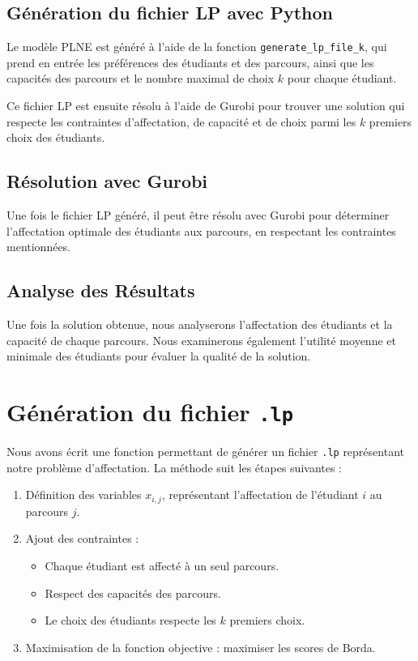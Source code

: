 \documentclass[a4paper,11pt]{article}
\begin{document}
\subsection{Génération du fichier LP avec Python}
Le modèle PLNE est généré à l’aide de la fonction \texttt{generate\_lp\_file\_k}, qui prend en entrée les préférences des étudiants et des parcours, ainsi que les capacités des parcours et le nombre maximal de choix \( k \) pour chaque étudiant.


Ce fichier LP est ensuite résolu à l'aide de Gurobi pour trouver une solution qui respecte les contraintes d'affectation, de capacité et de choix parmi les \( k \) premiers choix des étudiants.

\subsection{Résolution avec Gurobi}
Une fois le fichier LP généré, il peut être résolu avec Gurobi pour déterminer l’affectation optimale des étudiants aux parcours, en respectant les contraintes mentionnées.

\subsection{Analyse des Résultats}
Une fois la solution obtenue, nous analyserons l'affectation des étudiants et la capacité de chaque parcours. Nous examinerons également l'utilité moyenne et minimale des étudiants pour évaluer la qualité de la solution.


\section{Génération du fichier \texttt{.lp}}
Nous avons écrit une fonction permettant de générer un fichier \texttt{.lp} représentant notre problème d'affectation. La méthode suit les étapes suivantes :
\begin{enumerate}
    \item Définition des variables \( x_{i,j} \), représentant l'affectation de l'étudiant \( i \) au parcours \( j \).
    \item Ajout des contraintes :
    \begin{itemize}
        \item Chaque étudiant est affecté à un seul parcours.
        \item Respect des capacités des parcours.
        \item Le choix des étudiants respecte les \( k \) premiers choix.
    \end{itemize}
    \item Maximisation de la fonction objective : maximiser les scores de Borda.
\end{enumerate}
\end{document}

